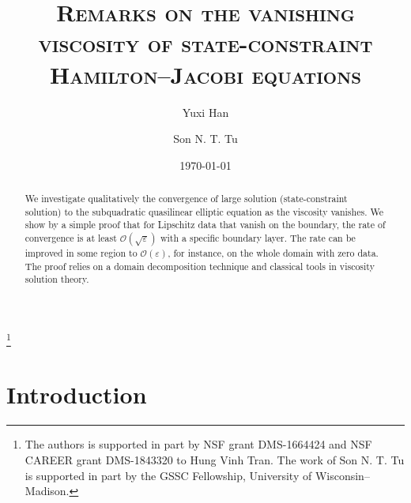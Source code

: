 \documentclass[11pt,reqno]{amsart}
\numberwithin{figure}{section}
\theoremstyle{plain}
\theoremstyle{remark}
\numberwithin{equation}{section}
\begin{document}
\title[Rate of convergence]
{\textsc{Remarks on the vanishing viscosity of state-constraint Hamilton--Jacobi equations}}
\thanks{The authors is supported in part by NSF grant DMS-1664424 and NSF CAREER grant DMS-1843320
to Hung Vinh Tran. The work of Son N. T. Tu is supported in part by the GSSC Fellowship, University of Wisconsin--Madison.}
\begin{abstract}
We investigate qualitatively the convergence of large solution (state-constraint solution) to the subquadratic quasilinear elliptic equation as the viscosity vanishes. We show by a simple proof that for Lipschitz data that vanish on the boundary, the rate of convergence is at least $\mathcal{O}(\sqrt{\varepsilon})$ with a specific boundary layer. The rate can be improved in some region to $\mathcal{O}(\varepsilon)$, for instance, on the whole domain with zero data. The proof relies on a domain decomposition technique and classical tools in viscosity solution theory.
\end{abstract}
\author{Yuxi Han}
\address[Y. Han]
{
Department of Mathematics, 
University of Wisconsin Madison, 480 Lincoln  Drive, Madison, WI 53706, USA}
\author{Son N. T. Tu}
\address[S. N.T. Tu]
{
Department of Mathematics, 
University of Wisconsin Madison, 480 Lincoln  Drive, Madison, WI 53706, USA}
\date{\today}
\maketitle
\setcounter{tocdepth}{1}
\tableofcontents

\section{Introduction}\label{sec:intro}
\end{document}
